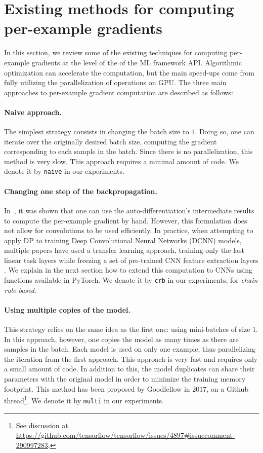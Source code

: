 \documentclass[11pt]{article}
\begin{document}
\section{Existing methods for computing per-example gradients}
\label{sec:clip_methods}

In this section, we review some of the existing techniques for computing
per-example gradients at the level of the of the ML framework API.
Algorithmic optimization can accelerate the computation, but the main
speed-ups come from fully utilizing the parallelization of operations on
GPU. The three main approaches to per-example gradient computation are
described as follows:

\paragraph{Naive approach.}
The simplest strategy consists in changing the batch size to $1$. Doing so,
one can iterate over the originally desired batch size, computing the
gradient corresponding to each sample in the batch. Since there is no
parallelization, this method is very slow. This approach requires a minimal
amount of code. We denote it by \texttt{naive} in our experiments.

\paragraph{Changing one step of the backpropagation.}
In~\cite{goodfellow2015efficient}, it was shown that one can use the
auto-differentiation's intermediate results to compute the per-example gradient
by hand. However, this formulation does not allow for convolutions
to be used efficiently. In practice, when attempting to apply DP to training
Deep Convolutional Neural Networks (DCNN) models, multiple papers have used
a transfer learning approach, training only the last linear task layers
while freezing a set of pre-trained CNN feature extraction layers
\cite{abadi2016deep,alain2015variance,bhowmick2018protection}. We explain in
the next section how to extend this computation to CNNs using functions
available in PyTorch. We denote it by \texttt{crb} in our experiments, for
\emph{chain rule based}.

\paragraph{Using multiple copies of the model.}
This strategy relies on the same idea as the first one: using mini-batches
of size 1. In this approach, however, one copies the model as many times as there
are samples in the batch. Each model is used on only one example, thus
parallelizing the iteration from the first approach. This approach is very
fast and requires only a small amount of code.
In addition to this, the model duplicates can share their parameters with
the original model in order to minimize the training memory footprint.
%
This method has been proposed by Goodfellow in 2017, on a Github
thread\footnote{See discussion at
\url{https://github.com/tensorflow/tensorflow/issues/4897\#issuecomment-290997283}.}.
We denote it by \texttt{multi} in our experiments.
\end{document}
